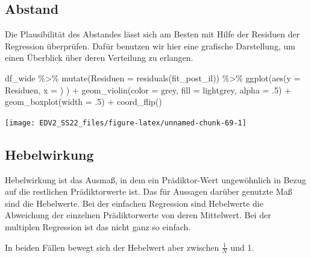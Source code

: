 \documentclass[
]{book}
\newenvironment{Shaded}{\begin{snugshade}}{\end{snugshade}}
\newcommand{\AttributeTok}[1]{\textcolor[rgb]{0.77,0.63,0.00}{#1}}
\newcommand{\DecValTok}[1]{\textcolor[rgb]{0.00,0.00,0.81}{#1}}
\newcommand{\FunctionTok}[1]{\textcolor[rgb]{0.00,0.00,0.00}{#1}}
\newcommand{\NormalTok}[1]{#1}
\newcommand{\SpecialCharTok}[1]{\textcolor[rgb]{0.00,0.00,0.00}{#1}}
\newcommand{\StringTok}[1]{\textcolor[rgb]{0.31,0.60,0.02}{#1}}
\begin{document}
\hypertarget{abstand}{%
\subsection{Abstand}\label{abstand}}

Die Plausibilität des Abstandes lässt sich am Besten mit Hilfe der Residuen der Regression überprüfen.
Dafür benutzen wir hier eine grafische Darstellung, um einen Überblick über deren Verteilung zu erlangen.

\begin{Shaded}
\begin{Highlighting}[]
\NormalTok{df\_wide }\SpecialCharTok{\%\textgreater{}\%} 
  \FunctionTok{mutate}\NormalTok{(}\AttributeTok{Residuen =} \FunctionTok{residuals}\NormalTok{(fit\_post\_il)) }\SpecialCharTok{\%\textgreater{}\%} 
\FunctionTok{ggplot}\NormalTok{(}\FunctionTok{aes}\NormalTok{(}\AttributeTok{y =}\NormalTok{ Residuen, }\AttributeTok{x =} \StringTok{\textquotesingle{}\textquotesingle{}}\NormalTok{) ) }\SpecialCharTok{+}
  \FunctionTok{geom\_violin}\NormalTok{(}\AttributeTok{color =} \StringTok{\textquotesingle{}grey\textquotesingle{}}\NormalTok{, }\AttributeTok{fill =} \StringTok{\textquotesingle{}lightgrey\textquotesingle{}}\NormalTok{,}
              \AttributeTok{alpha =}\NormalTok{ .}\DecValTok{5}\NormalTok{) }\SpecialCharTok{+}
  \FunctionTok{geom\_boxplot}\NormalTok{(}\AttributeTok{width =}\NormalTok{ .}\DecValTok{5}\NormalTok{) }\SpecialCharTok{+}
  \FunctionTok{coord\_flip}\NormalTok{()}
\end{Highlighting}
\end{Shaded}

\begin{center}\texttt{[image: EDV2\_SS22\_files/figure-latex/unnamed-chunk-69-1]} \end{center}

\hypertarget{hebelwirkung}{%
\subsection{Hebelwirkung}\label{hebelwirkung}}

Hebelwirkung ist das Ausmaß, in dem ein Prädiktor-Wert ungewöhnlich in Bezug auf die restlichen Prädiktorwerte ist. Das für Aussagen darüber genutzte Maß sind die Hebelwerte.
Bei der einfachen Regression sind Hebelwerte die Abweichung der einzelnen Prädiktorwerte von deren Mittelwert. Bei der multiplen Regression ist das nicht ganz so einfach.

In beiden Fällen bewegt sich der Hebelwert aber zwischen \(\frac{1}{N}\) und 1.
\end{document}
